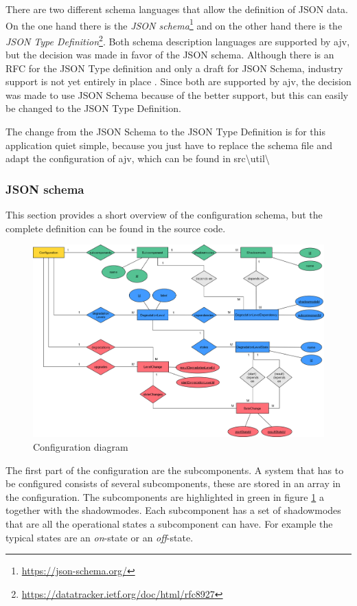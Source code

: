 There are two different schema languages that allow the definition of JSON data. On the one hand there is the \textit{JSON schema}\footnote{\url{https://json-schema.org/}} and on the other hand there is the \textit{JSON Type Definition}\footnote{\url{https://datatracker.ietf.org/doc/html/rfc8927}}. Both schema description languages are supported by ajv, but the decision was made in favor of the JSON schema. Although there is an RFC for the JSON Type definition and only a draft for JSON Schema, industry support is not yet entirely in place \cite{ajv_comparison}. Since both are supported by ajv, the decision was made to use JSON Schema because of the better support, but this can easily be changed to the JSON Type Definition.

The change from the JSON Schema to the JSON Type Definition is for this application quiet simple, because you just have to replace the schema file and adapt the configuration of ajv, which can be found in src\textbackslash util\textbackslash

\subsubsection{JSON schema}
This section provides a short overview of the configuration schema, but the complete definition can be found in the source code.

\begin{figure}[ht]
    \centering
    \includegraphics[width=\textwidth]{img/configuration_diagramm.png}
    \caption{Configuration diagram}
    \label{fig:configuration_diagram}
\end{figure}

The first part of the configuration are the subcomponents. A system that has to be configured consists of several subcomponents, these are stored in an array in the configuration. The subcomponents are highlighted in green in figure \ref{fig:configuration_diagram} a together with the shadowmodes. Each subcomponent has a set of shadowmodes that are all the operational states a subcomponent can have. For example the typical states are an \textit{on}-state or an \textit{off}-state.

